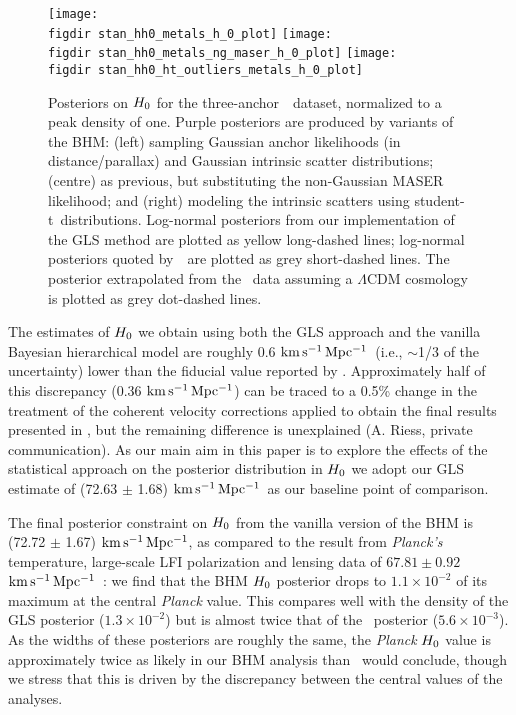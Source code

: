 \documentclass[a4paper,fleqn,usenatbib]{mnras}
\newcommand{\riess}{\citetalias{Riess_etal:2016}}
\newcommand{\studentdist}{student-t}
\newcommand{\kmsmpc}{\ensuremath{{\rm km\,s^{-1}\,Mpc^{-1}}}}
\begin{document}
{\begin{figure*}
\texttt{[image: \\figdir stan\_hh0\_metals\_h\_0\_plot]}
\texttt{[image: \\figdir stan\_hh0\_metals\_ng\_maser\_h\_0\_plot]}
\texttt{[image: \\figdir stan\_hh0\_ht\_outliers\_metals\_h\_0\_plot]}
\caption{Posteriors on $H_0$ for the three-anchor~\protect\riess\ dataset, normalized to a peak density of one. Purple posteriors are produced by variants of the BHM: (left) sampling Gaussian anchor likelihoods (in distance/parallax) and Gaussian intrinsic scatter distributions; (centre) as previous, but substituting the non-Gaussian MASER likelihood; and (right) modeling the intrinsic scatters using \studentdist\ distributions. Log-normal posteriors from our implementation of the GLS method are plotted as yellow long-dashed lines; log-normal posteriors quoted by~\protect\riess\ are plotted as grey short-dashed lines. The posterior extrapolated from the~\citet{Planck_XIII:2016} data assuming a $\Lambda$CDM cosmology is plotted as grey dot-dashed lines.}
\label{figure:data_h_0_comp}
\end{figure*}

The estimates of $H_0$ we obtain using both the GLS approach and the vanilla Bayesian hierarchical model are roughly 0.6 \kmsmpc\ (i.e., $\sim$1/3 of the uncertainty) lower than the fiducial value reported by \riess. Approximately half of this discrepancy (0.36 \kmsmpc) can be traced to a 0.5\% change in the treatment of the coherent velocity corrections applied to obtain the final results presented in \riess, but the remaining difference is unexplained (A. Riess, private communication). As our main aim in this paper is to explore the effects of the statistical approach on the posterior distribution in $H_0$ we adopt our GLS estimate of (72.63 $\pm$ 1.68) \kmsmpc\ as our baseline point of comparison.

The final posterior constraint on $H_0$ from the vanilla version of the BHM is (72.72 $\pm$ 1.67) \kmsmpc, as compared to the result from {\it Planck's} temperature, large-scale LFI polarization and lensing data of $67.81 \pm 0.92$ \kmsmpc~\citep{Planck_XIII:2016}: we find that the BHM $H_0$ posterior drops to $1.1\times10^{-2}$ of its maximum at the central {\it Planck} value. This compares well with the density of the GLS posterior ($1.3\times10^{-2}$) but is almost twice that of the \riess\ posterior ($5.6\times10^{-3}$). As the widths of these posteriors are roughly the same, the {\it Planck} $H_0$ value is approximately twice as likely in our BHM analysis than \riess\ would conclude, though we stress that this is driven by the discrepancy between the central values of the analyses.

}
\end{document}
